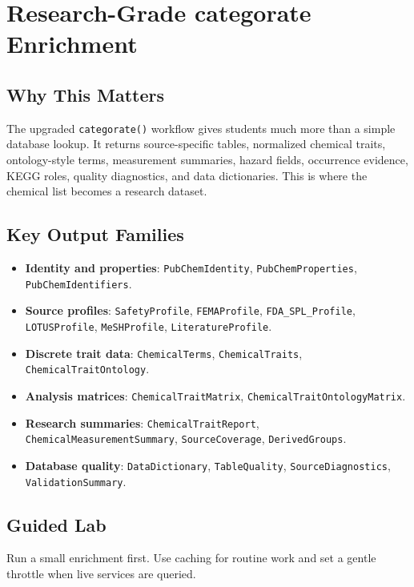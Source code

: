 \chapter{Research-Grade categorate Enrichment}


\section{Why This Matters}
The upgraded \texttt{categorate()} workflow gives students much more than a simple database lookup. It returns source-specific tables, normalized chemical traits, ontology-style terms, measurement summaries, hazard fields, occurrence evidence, KEGG roles, quality diagnostics, and data dictionaries. This is where the chemical list becomes a research dataset.

\section{Key Output Families}
\begin{itemize}
  \item \textbf{Identity and properties}: \texttt{PubChemIdentity}, \texttt{PubChemProperties}, \texttt{PubChemIdentifiers}.
  \item \textbf{Source profiles}: \texttt{SafetyProfile}, \texttt{FEMAProfile}, \texttt{FDA\_SPL\_Profile}, \texttt{LOTUSProfile}, \texttt{MeSHProfile}, \texttt{LiteratureProfile}.
  \item \textbf{Discrete trait data}: \texttt{ChemicalTerms}, \texttt{ChemicalTraits}, \texttt{ChemicalTraitOntology}.
  \item \textbf{Analysis matrices}: \texttt{ChemicalTraitMatrix}, \texttt{ChemicalTraitOntologyMatrix}.
  \item \textbf{Research summaries}: \texttt{ChemicalTraitReport}, \texttt{ChemicalMeasurementSummary}, \texttt{SourceCoverage}, \texttt{DerivedGroups}.
  \item \textbf{Database quality}: \texttt{DataDictionary}, \texttt{TableQuality}, \texttt{SourceDiagnostics}, \texttt{ValidationSummary}.
\end{itemize}

\section{Guided Lab}
Run a small enrichment first. Use caching for routine work and set a gentle throttle when live services are queried.

